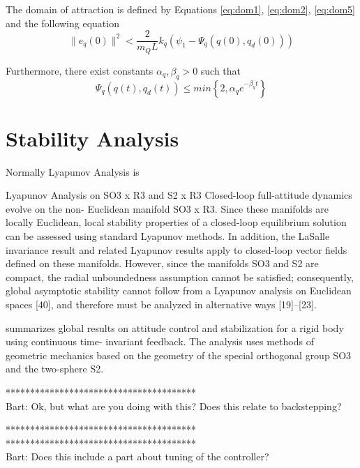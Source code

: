 The domain of attraction is defined by Equations \ref{eq:dom1}, \ref{eq:dom2}, \ref{eq:dom5} and the following equation
\begin{equation}
\parallel e_{\dot{q}}(0)\parallel^2<\frac{2}{m_QL}{k_q}(\psi_1-\Psi_q(q(0),q_d(0)))
\end{equation}


Furthermore, there exist constants $ \alpha_q,\beta_q>0 $ such that
\begin{equation}\label{key}
\Psi_q(q(t),q_d(t)) \leq min\left\lbrace 2,\alpha_qe^{-\beta_qt}\right\rbrace 
\end{equation}

\section{Stability Analysis}\label{sec:con.sta}

Normally Lyapunov Analysis is 


Lyapunov Analysis on SO3 x R3 and S2 x R3
Closed-loop full-attitude dynamics evolve on the non- Euclidean manifold SO3 x R3. 
Since these manifolds are locally Euclidean, local stability properties of a closed-loop equilibrium solution can be assessed using standard Lyapunov methods. 
In addition, the LaSalle invariance result and related Lyapunov results apply to closed-loop vector fields defined on these manifolds. 
However, since the manifolds SO3 and S2 are compact, the radial unboundedness assumption cannot be satisfied; 
consequently, global asymptotic stability cannot follow from a Lyapunov analysis on Euclidean spaces [40], and therefore must be analyzed in alternative ways [19]–[23].\cite[p.43]{Chaturvedi2011}

\cite{Chaturvedi2011} summarizes global results on attitude control and stabilization for a rigid body using continuous time- invariant feedback. The analysis uses methods of geometric mechanics based on the geometry of the special orthogonal group SO3 and the two-sphere S2.


***************************************\\
Bart: Ok, but what are you doing with this? Does this relate to backstepping?

***************************************\\


***************************************\\
Bart: Does this include a part about tuning of the controller?

